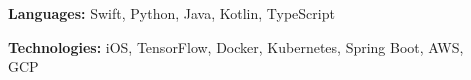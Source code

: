 
\begin{description}
    \item[]{\bf Languages:}
    { \footnotesize 
    Swift, Python, Java, Kotlin, TypeScript
    }
    \item[]{\bf Technologies:}
    { \footnotesize 
    iOS, TensorFlow, Docker, Kubernetes, Spring Boot, AWS, GCP
    }
\end{description}